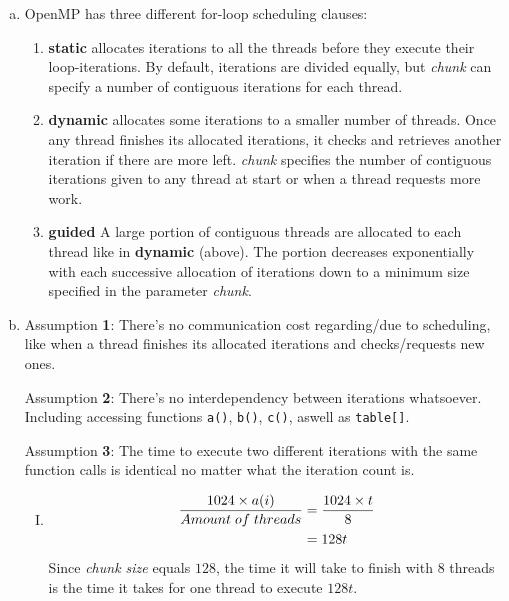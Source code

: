 \documentclass[fontsize=11pt, paper=a4, titlepage]{article}
\begin{document}
\begin{enumerate}[a)]

    \item OpenMP has three different for-loop scheduling clauses:
    \begin{enumerate}[1)]

        \item \textbf{static} allocates iterations to all the threads before
they execute their loop-iterations. By default, iterations are divided equally,
but \textit{chunk} can specify a number of contiguous iterations for each
thread.

        \item \textbf{dynamic} allocates some iterations to a smaller number of
threads. Once any thread finishes its allocated iterations, it checks and
retrieves another iteration if there are more left. \textit{chunk} specifies the
number of contiguous iterations given to any thread at start or when a thread
requests more work.

        \item \textbf{guided} A large portion of contiguous threads are
allocated to  each thread like in \textbf{dynamic} (above). The portion decreases exponentially with each successive allocation of iterations down to a minimum size specified in the parameter \textit{chunk}.

    \end{enumerate}

    \item Assumption \textbf{1}: There's no communication cost regarding/due to
scheduling, like when a thread finishes its allocated iterations and
checks/requests new ones.

Assumption \textbf{2}: There's no interdependency between iterations whatsoever.
Including accessing functions \lstinline!a()!, \lstinline!b()!, \lstinline!c()!,
aswell as \lstinline!table[]!.

Assumption \textbf{3}: The time to execute two different iterations with the
same function calls is identical no matter what the iteration count is.

    \begin{enumerate}[I)]

        \item\begin{align*}
            \frac{1024\times a(i)}{Amount\thickspace of\thickspace threads} &=
            \frac{1024\times t}{8}\\
            &= 128t
        \end{align*}
        Since \textit{chunk size} equals $128$, the time it will take to finish
with $8$ threads is the time it takes for one thread to execute $128t$.


\end{enumerate}
\end{enumerate}
\end{document}

